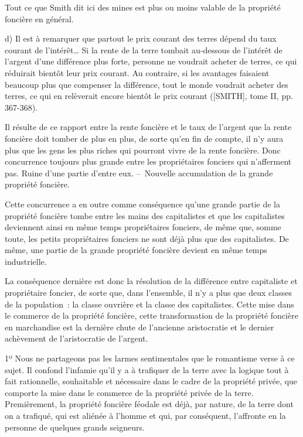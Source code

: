 \documentclass[french,twoside]{book} %
\newenvironment{quoteblock}%
  {\begin{quoting}}
  {\end{quoting}}
\newenvironment{quotebar}{%
    \def\FrameCommand{{\color{rubric!10!}\vrule width 0.5em} \hspace{0.9em}}%
    \def\OuterFrameSep{\itemsep} %
    \MakeFramed {\advance\hsize-\width \FrameRestore}
  }%
  {%
    \endMakeFramed
  }
\renewenvironment{quoteblock}%
  {%
    \savenotes
    \setstretch{0.9}
    \normalfont
    \begin{quotebar}
  }
  {%
    \end{quotebar}
    \spewnotes
  }
\begin{document}
\noindent Tout ce que Smith dit ici des mines est plus ou moins valable de la propriété foncière en général.\par

\begin{quoteblock}
 \noindent d) Il est à remarquer que partout le prix courant des terres dépend du taux courant de l’intérêt… Si la rente de la terre tombait au-dessous de l’intérêt de l’argent d’une différence plus forte, personne ne voudrait acheter de terres, ce qui réduirait bientôt leur prix courant. Au contraire, si les avantages faisaient beaucoup plus que compenser la différence, tout le monde voudrait acheter des terres, ce qui en relèverait encore bientôt le prix courant ([SMITH], tome II, pp. 367-368).
 \end{quoteblock}

\noindent Il résulte de ce rapport entre la rente foncière et le taux de l’argent que la rente foncière doit tomber de plus en plus, de sorte qu’en fin de compte, il n’y aura plus que les gens les plus riches qui pourront vivre de la rente foncière. Donc concurrence toujours plus grande entre les propriétaires fonciers qui n’afferment pas. Ruine d’une partie d’entre eux. – Nouvelle accumulation de la grande propriété foncière.\par
[XVII] Cette concurrence a en outre comme conséquence qu’une grande partie de la propriété foncière tombe entre les mains des capitalistes et que les capitalistes deviennent ainsi en même temps propriétaires fonciers, de même que, somme toute, les petits propriétaires fonciers ne sont déjà plus que des capitalistes. De même, une partie de la grande propriété foncière devient en même temps industrielle.\par
La conséquence dernière est donc la résolution de la différence entre capitaliste et propriétaire foncier, de sorte que, dans l’ensemble, il n’y a plus que deux classes de la population : la classe ouvrière et la classe des capitalistes. Cette mise dans le commerce de la propriété foncière, cette transformation de la propriété foncière en marchandise est la dernière chute de l’ancienne aristocratie et le dernier achèvement de l’aristocratie de l’argent.\par
1º Nous ne partageons pas les larmes sentimentales que le romantisme verse à ce sujet. Il confond l’infamie qu’il y a à trafiquer de la terre avec la logique tout à fait rationnelle, souhaitable et nécessaire dans le cadre de la propriété privée, que comporte la mise dans le commerce de la propriété privée de la terre. Premièrement, la propriété foncière féodale est déjà, par nature, de la terre dont on a trafiqué, qui est aliénée à l’homme et qui, par conséquent, l’affronte en la personne de quelques grands seigneurs.\par
\end{document}
